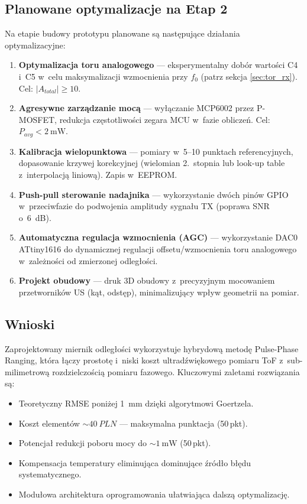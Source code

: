 \documentclass[a4paper,11pt]{article}
\begin{document}
\subsection{Planowane optymalizacje na Etap 2}

Na etapie budowy prototypu planowane są następujące działania optymalizacyjne:

\begin{enumerate}[nosep]
    \item \textbf{Optymalizacja toru analogowego} --- eksperymentalny dobór
          wartości C4 i~C5 w~celu maksymalizacji wzmocnienia przy $f_0$ (patrz
          sekcja \ref{sec:tor_rx}). Cel: $|A_{total}| \geq 10$.
    \item \textbf{Agresywne zarządzanie mocą} --- wyłączanie MCP6002 przez
          P-MOSFET, redukcja częstotliwości zegara MCU w~fazie obliczeń.
          Cel: $P_{avg} < \SI{2}{\milli\watt}$.
    \item \textbf{Kalibracja wielopunktowa} --- pomiary w~5--10 punktach
          referencyjnych, dopasowanie krzywej korekcyjnej (wielomian 2.~stopnia
          lub look-up table z~interpolacją liniową). Zapis w~EEPROM.
    \item \textbf{Push-pull sterowanie nadajnika} --- wykorzystanie dwóch pinów
          GPIO w~przeciwfazie do podwojenia amplitudy sygnału TX (poprawa SNR
          o~\SI{6}{\deci\bel}).
    \item \textbf{Automatyczna regulacja wzmocnienia (AGC)} --- wykorzystanie
          DAC0 ATtiny1616 do dynamicznej regulacji offsetu/wzmocnienia toru
          analogowego w~zależności od zmierzonej odległości.
    \item \textbf{Projekt obudowy} --- druk 3D obudowy z~precyzyjnym mocowaniem
          przetworników US (kąt, odstęp), minimalizujący wpływ geometrii na pomiar.
\end{enumerate}

\subsection{Wnioski}

Zaprojektowany miernik odległości wykorzystuje hybrydową metodę Pulse-Phase
Ranging, która łączy prostotę i~niski koszt ultradźwiękowego pomiaru ToF
z~sub-milimetrową rozdzielczością pomiaru fazowego. Kluczowymi zaletami
rozwiązania są:

\begin{itemize}[nosep]
    \item Teoretyczny RMSE poniżej \SI{1}{\milli\metre} dzięki algorytmowi Goertzela.
    \item Koszt elementów ${\sim}\SI{40}{PLN}$ --- maksymalna punktacja (50\,pkt).
    \item Potencjał redukcji poboru mocy do ${\sim}\SI{1}{\milli\watt}$ (50\,pkt).
    \item Kompensacja temperatury eliminująca dominujące źródło błędu systematycznego.
    \item Modułowa architektura oprogramowania ułatwiająca dalszą optymalizację.
\end{itemize}
\end{document}
